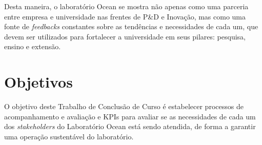 Desta maneira, o laboratório Ocean se mostra não apenas como uma parceria entre empresa e universidade nas frentes de  P\&D e Inovação, mas como uma fonte de \textit{feedbacks} constantes sobre as tendências e necessidades de cada um, que devem ser utilizados para fortalecer a universidade em seus pilares: pesquisa, ensino e extensão.

\section[Objetivos]{Objetivos}
\label{chap:objetivos}

O objetivo deste Trabalho de Conclusão de Curso é estabelecer processos de acompanhamento e avaliação e KPIs para avaliar se as necessidades de cada um dos \textit{stakeholders} do Laboratório Ocean está sendo atendida, de forma a garantir uma operação sustentável do laboratório.